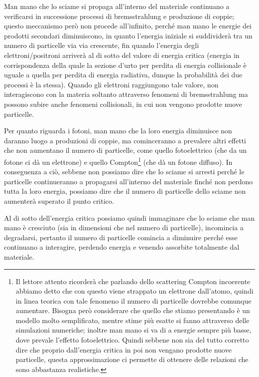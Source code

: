 Man mano che lo sciame si propaga all'interno del materiale continuano a verificarsi in successione processi di bremsstrahlung e produzione di coppie; questo meccanismo però non procede all'infinito, perché man mano le energie dei prodotti secondari diminuiscono, in quanto l'energia iniziale si suddividerà tra un numero di particelle via via crescente, fin quando l'energia degli elettroni/positroni arriverà al di sotto del valore di energia critica (energia in corrispondenza della quale la sezione d'urto per perdita di energia collisionale è uguale a quella per perdita di energia radiativa, dunque la probabilità dei due processi è la stessa). Quando gli elettroni raggiungono tale valore, non interagiscono con la materia soltanto attraverso fenomeni di bremsstrahlung ma possono subire anche fenomeni collisionali, in cui non vengono prodotte nuove particelle.

Per quanto riguarda i fotoni, man mano che la loro energia diminuisce non daranno luogo a produzioni di coppie, ma cominceranno a prevalere altri effetti che non aumentano il numero di particelle, come quello fotoelettrico (che da un fotone ci dà un elettrone) e quello Compton\footnote{Il lettore attento ricorderà che parlando dello scattering Compton incoerente abbiamo detto che con questo viene strappato un elettrone dall'atomo, quindi in linea teorica con tale fenomeno il numero di particelle dovrebbe comunque aumentare. Bisogna però considerare che quello che stiamo presentando è un modello molto semplificato, mentre stime più esatte si fanno attraverso delle simulazioni numeriche; inoltre man mano si va di a energie sempre più basse, dove prevale l'effetto fotoelettrico. Quindi sebbene non sia del tutto corretto dire che proprio dall'energia critica in poi non vengano prodotte nuove particelle, questa approssimazione ci permette di ottenere delle relazioni che sono abbastanza realistiche.} (che dà un fotone diffuso). In conseguenza a ciò, sebbene non possiamo dire che lo sciame si arresti perché le particelle continueranno a propagarsi all'interno del materiale finché non perdono tutta la loro energia, possiamo dire che il numero di particelle dello sciame non aumenterà superato il punto critico.

Al di sotto dell'energia critica possiamo quindi immaginare che lo sciame che man mano è cresciuto (sia in dimensioni che nel numero di particelle), incomincia a degradarsi, pertanto il numero di particelle comincia a diminuire perché esse continuano a interagire, perdendo energia e venendo assorbite totalmente dal materiale.

